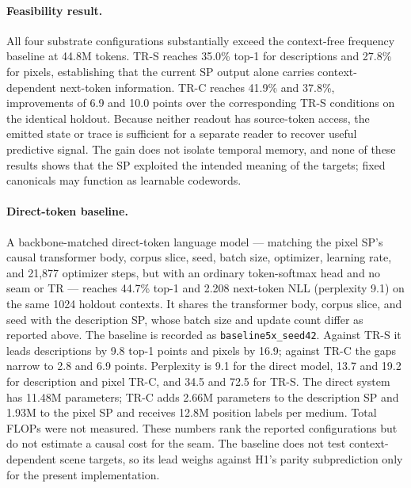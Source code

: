 \documentclass[11pt,a4paper]{article}
\begin{document}
\paragraph{Feasibility result.} All four substrate configurations substantially exceed the context-free frequency baseline at 44.8M tokens. TR-S reaches 35.0\% top-1 for descriptions and 27.8\% for pixels, establishing that the current SP output alone carries context-dependent next-token information. TR-C reaches 41.9\% and 37.8\%, improvements of 6.9 and 10.0 points over the corresponding TR-S conditions on the identical holdout. Because neither readout has source-token access, the emitted state or trace is sufficient for a separate reader to recover useful predictive signal. The gain does not isolate temporal memory, and none of these results shows that the SP exploited the intended meaning of the targets; fixed canonicals may function as learnable codewords.

\paragraph{Direct-token baseline.} A backbone-matched direct-token language model --- matching the pixel SP's causal transformer body, corpus slice, seed, batch size, optimizer, learning rate, and 21,877 optimizer steps, but with an ordinary token-softmax head and no seam or TR --- reaches 44.7\% top-1 and 2.208 next-token NLL (perplexity 9.1) on the same 1024 holdout contexts. It shares the transformer body, corpus slice, and seed with the description SP, whose batch size and update count differ as reported above. The baseline is recorded as \texttt{baseline5x\_seed42}. Against TR-S it leads descriptions by 9.8 top-1 points and pixels by 16.9; against TR-C the gaps narrow to 2.8 and 6.9 points. Perplexity is 9.1 for the direct model, 13.7 and 19.2 for description and pixel TR-C, and 34.5 and 72.5 for TR-S. The direct system has 11.48M parameters; TR-C adds 2.66M parameters to the description SP and 1.93M to the pixel SP and receives 12.8M position labels per medium. Total FLOPs were not measured. These numbers rank the reported configurations but do not estimate a causal cost for the seam. The baseline does not test context-dependent scene targets, so its lead weighs against H1's parity subprediction only for the present implementation.
\end{document}
